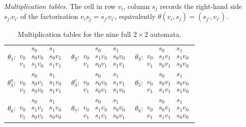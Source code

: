 \documentclass[11pt,reqno]{amsart}
\theoremstyle{plain}
\theoremstyle{definition}
\begin{document}
\emph{Multiplication tables.} The cell in row $v_i$, column $s_j$ records the
right-hand side $s_{j'}v_{i'}$ of the factorisation $v_is_j=s_{j'}v_{i'}$, equivalently
$\theta(v_i,s_j)=(s_{j'},v_{i'})$.
\begin{table}[ht]
\centering
\renewcommand{\arraystretch}{1.15}
\begin{tabular}{ccc} 
$\theta_1\colon\begin{array}{c|cc} & s_0 & s_1\\\hline v_0 & s_0v_0 & s_0v_1\\ v_1 & s_1v_0 & s_1v_1\end{array}$ &
$\theta_2\colon\begin{array}{c|cc} & s_0 & s_1\\\hline v_0 & s_1v_0 & s_0v_0\\ v_1 & s_0v_1 & s_1v_1\end{array}$ &
$\theta_3\colon\begin{array}{c|cc} & s_0 & s_1\\\hline v_0 & s_1v_1 & s_1v_0\\ v_1 & s_0v_1 & s_0v_0\end{array}$ \\[2ex]
$\theta_4^a\colon\begin{array}{c|cc} & s_0 & s_1\\\hline v_0 & s_0v_1 & s_1v_0\\ v_1 & s_0v_0 & s_1v_1\end{array}$ &
$\theta_4^c\colon\begin{array}{c|cc} & s_0 & s_1\\\hline v_0 & s_0v_0 & s_1v_1\\ v_1 & s_0v_1 & s_1v_0\end{array}$ &
$\theta_5\colon\begin{array}{c|cc} & s_0 & s_1\\\hline v_0 & s_0v_1 & s_0v_0\\ v_1 & s_1v_1 & s_1v_0\end{array}$ \\[2ex]
$\theta_6\colon\begin{array}{c|cc} & s_0 & s_1\\\hline v_0 & s_1v_1 & s_1v_0\\ v_1 & s_0v_1 & s_0v_0\end{array}$ &
$\theta_7\colon\begin{array}{c|cc} & s_0 & s_1\\\hline v_0 & s_1v_0 & s_0v_0\\ v_1 & s_1v_1 & s_0v_1\end{array}$ &
$\theta_8\colon\begin{array}{c|cc} & s_0 & s_1\\\hline v_0 & s_0v_1 & s_1v_0\\ v_1 & s_1v_1 & s_0v_0\end{array}$
\end{tabular}
\caption{Multiplication tables for the nine full $2\times2$ automata.}
\label{tables}
\end{table}
\end{document}
